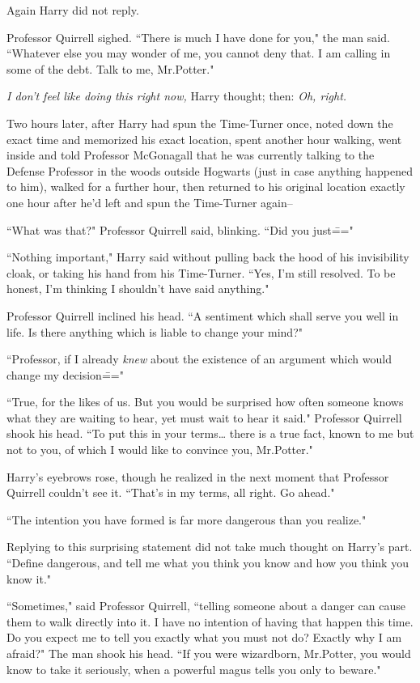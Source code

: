 Again Harry did not reply.

Professor Quirrell sighed. ``There is much I have done for you," the man said. ``Whatever else you may wonder of me, you cannot deny that. I am calling in some of the debt. Talk to me, Mr.\?Potter."

\emph{I don't feel like doing this right now,} Harry thought; then: \emph{Oh, right.}

\later

Two hours later, after Harry had spun the Time-Turner once, noted down the exact time and memorized his exact location, spent another hour walking, went inside and told Professor McGonagall that he was currently talking to the Defense Professor in the woods outside Hogwarts (just in case anything happened to him), walked for a further hour, then returned to his original location exactly one hour after he'd left and spun the Time-Turner again\---

\later

``What was that?" Professor Quirrell said, blinking. ``Did you just\==="

``Nothing important," Harry said without pulling back the hood of his invisibility cloak, or taking his hand from his Time-Turner. ``Yes, I'm still resolved. To be honest, I'm thinking I shouldn't have said anything."

Professor Quirrell inclined his head. ``A sentiment which shall serve you well in life. Is there anything which is liable to change your mind?"

``Professor, if I already \emph{knew} about the existence of an argument which would change my decision\==="

``True, for the likes of us. But you would be surprised how often someone knows what they are waiting to hear, yet must wait to hear it said." Professor Quirrell shook his head. ``To put this in your terms{\ldots} there is a true fact, known to me but not to you, of which I would like to convince you, Mr.\?Potter."

Harry's eyebrows rose, though he realized in the next moment that Professor Quirrell couldn't see it. ``That's in my terms, all right. Go ahead."

``The intention you have formed is far more dangerous than you realize."

Replying to this surprising statement did not take much thought on Harry's part. ``Define dangerous, and tell me what you think you know and how you think you know it."

``Sometimes," said Professor Quirrell, ``telling someone about a danger can cause them to walk directly into it. I have no intention of having that happen this time. Do you expect me to tell you exactly what you must not do? Exactly why I am afraid?" The man shook his head. ``If you were wizardborn, Mr.\?Potter, you would know to take it seriously, when a powerful magus tells you only to beware."

